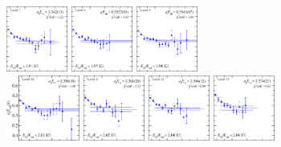 \begin{figure}[H]
    \includegraphics[width=0.18\textwidth]{figures/sigmas/g1u/fits/fit_9.pdf}
    \includegraphics[width=0.18\textwidth]{figures/sigmas/g1u/fits/fit_8.pdf}
    \includegraphics[width=0.18\textwidth]{figures/sigmas/g1u/fits/fit_6.pdf}\\
    \includegraphics[width=0.215\textwidth]{figures/sigmas/g1u/fits/fit_7.pdf}
    \includegraphics[width=0.18\textwidth]{figures/sigmas/g1u/fits/fit_13.pdf}
    \includegraphics[width=0.18\textwidth]{figures/sigmas/g1u/fits/fit_11.pdf}
    \includegraphics[width=0.18\textwidth]{figures/sigmas/g1u/fits/fit_15.pdf}

\end{figure}

